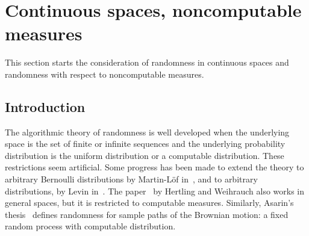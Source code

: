  \section{Continuous spaces, noncomputable measures}\label{sec:cont-spaces}

This section starts the consideration of randomness in continuous spaces and
randomness with respect to noncomputable measures.

\subsection{Introduction}

The algorithmic theory of randomness is well developed when the underlying
space is the set of finite or infinite sequences and the underlying
probability distribution is the uniform distribution or a computable
distribution.
These restrictions seem artificial.  
Some progress has been
made to extend the theory to arbitrary Bernoulli distributions by
Martin-L\"of in~\cite{MLof66art}, and to arbitrary distributions, by Levin
in~\cite{LevinRand73,LevinUnif76,LevinRandCons84}.
The paper~\cite{HertlingWeihrauchRand98} by Hertling and Weihrauch 
also works in general spaces, but it is restricted to computable
measures.
Similarly, Asarin's thesis~\cite{Asarin88} defines randomness for sample
paths of the Brownian motion: a fixed random process with computable
distribution.

